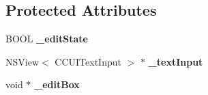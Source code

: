 \subsection*{Protected Attributes}
\begin{DoxyCompactItemize}
\item 
\mbox{\label{interfaceUIEditBoxImplMac_aa841125e592d3f300b376345955dad5d}} 
B\+O\+OL {\bfseries \+\_\+edit\+State}
\item 
\mbox{\label{interfaceUIEditBoxImplMac_a96a4eb2775886c907a111e80165306f1}} 
N\+S\+View$<$ C\+C\+U\+I\+Text\+Input $>$ $\ast$ {\bfseries \+\_\+text\+Input}
\item 
\mbox{\label{interfaceUIEditBoxImplMac_a768ad721156a99b40630608a5efa7f4a}} 
void $\ast$ {\bfseries \+\_\+edit\+Box}
\end{DoxyCompactItemize}
